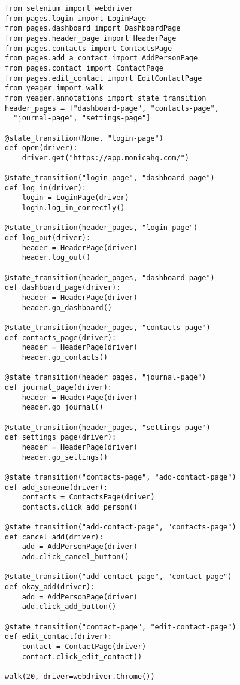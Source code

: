 \begin{Verbatim}[fontsize=\small]
from selenium import webdriver
from pages.login import LoginPage
from pages.dashboard import DashboardPage
from pages.header_page import HeaderPage
from pages.contacts import ContactsPage
from pages.add_a_contact import AddPersonPage
from pages.contact import ContactPage
from pages.edit_contact import EditContactPage
from yeager import walk
from yeager.annotations import state_transition
header_pages = ["dashboard-page", "contacts-page",
  "journal-page", "settings-page"]

@state_transition(None, "login-page")
def open(driver):
    driver.get("https://app.monicahq.com/")

@state_transition("login-page", "dashboard-page")
def log_in(driver):
    login = LoginPage(driver)
    login.log_in_correctly()

@state_transition(header_pages, "login-page")
def log_out(driver):
    header = HeaderPage(driver)
    header.log_out()

@state_transition(header_pages, "dashboard-page")
def dashboard_page(driver):
    header = HeaderPage(driver)
    header.go_dashboard()

@state_transition(header_pages, "contacts-page")
def contacts_page(driver):
    header = HeaderPage(driver)
    header.go_contacts()

@state_transition(header_pages, "journal-page")
def journal_page(driver):
    header = HeaderPage(driver)
    header.go_journal()

@state_transition(header_pages, "settings-page")
def settings_page(driver):
    header = HeaderPage(driver)
    header.go_settings()

@state_transition("contacts-page", "add-contact-page")
def add_someone(driver):
    contacts = ContactsPage(driver)
    contacts.click_add_person()

@state_transition("add-contact-page", "contacts-page")
def cancel_add(driver):
    add = AddPersonPage(driver)
    add.click_cancel_button()

@state_transition("add-contact-page", "contact-page")
def okay_add(driver):
    add = AddPersonPage(driver)
    add.click_add_button()

@state_transition("contact-page", "edit-contact-page")
def edit_contact(driver):
    contact = ContactPage(driver)
    contact.click_edit_contact()

walk(20, driver=webdriver.Chrome())

\end{Verbatim}


